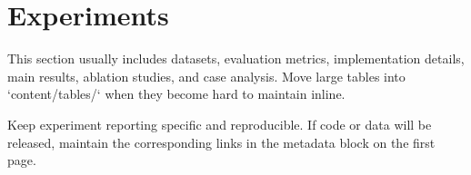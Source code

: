 \section{Experiments}

This section usually includes datasets, evaluation metrics, implementation details, main results, ablation studies, and case analysis. Move large tables into `content/tables/` when they become hard to maintain inline.

Keep experiment reporting specific and reproducible. If code or data will be released, maintain the corresponding links in the metadata block on the first page.
